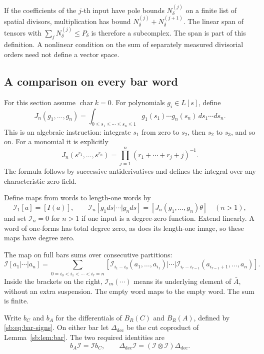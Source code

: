 If the coefficients of the \(j\)-th input have pole bounds
\(N^{(j)}_\delta\) on a finite list of spatial divisors, multiplication
has bound \(N^{(j)}_\delta+N^{(j+1)}_\delta\).
The linear span of tensors with
\(\sum_jN^{(j)}_\delta\le P_\delta\) is therefore a subcomplex.
The span is part of this definition.  A nonlinear condition on the
sum of separately measured divisorial orders need not define a vector space.

\subsection{A comparison on every bar word}

For this section assume \(\operatorname{char}k=0\).
For polynomials \(g_i\in L[s]\), define
\begin{equation}\label{sb:eq:iterated-integral}
 J_n(g_1,\ldots,g_n)=
 \int_{0\le s_1\le\cdots\le s_n\le1}
       g_1(s_1)\cdots g_n(s_n)\,ds_1\cdots ds_n.
\end{equation}
This is an algebraic instruction: integrate \(s_1\) from zero to
\(s_2\), then \(s_2\) to \(s_3\), and so on.
For a monomial it is explicitly
\[
 J_n(s^{r_1},\ldots,s^{r_n})
 =\prod_{j=1}^n(r_1+\cdots+r_j+j)^{-1}.
\]
The formula follows by successive antiderivatives and defines the
integral over any characteristic-zero field.

Define maps from words to length-one words by
\[
 \mathcal I_1[a]=[I(a)],\qquad
 \mathcal I_n[g_1ds|\cdots|g_nds]
       =[J_n(g_1,\ldots,g_n)\theta]\quad(n>1),
\]
and set \(\mathcal I_n=0\) for \(n>1\) if one input is a
degree-zero function.  Extend linearly.  A word of one-forms has total
degree zero, as does its length-one image, so these maps have degree zero.

The map on full bars sums over consecutive partitions:
\begin{equation}\label{sb:eq:bar-map}
 \mathcal I[a_1|\cdots|a_n]
 =\sum_{0=i_0<i_1<\cdots<i_r=n}
   [\mathcal I_{i_1-i_0}(a_1,\ldots,a_{i_1})|\cdots|
    \mathcal I_{i_r-i_{r-1}}(a_{i_{r-1}+1},\ldots,a_n)].
\end{equation}
Inside the brackets on the right, \(\mathcal I_m(\cdots)\)
means its underlying element of \(\bar A\), without an extra suspension.
The empty word maps to the empty word.  The sum is finite.

Write \(b_C\) and \(b_A\) for the differentials of
\(B_R(C)\) and \(B_R(A)\), defined by \eqref{sb:eq:bar-signs}.
On either bar let \(\Delta_{\mathrm{dec}}\) be the cut coproduct
of Lemma~\ref{sb:lem:bar}.  The two required identities are
\begin{equation}\label{sb:eq:spine}
 b_A\mathcal I=\mathcal I b_C,
 \qquad
 \Delta_{\mathrm{dec}}\mathcal I
       =(\mathcal I\otimes\mathcal I)\Delta_{\mathrm{dec}}.
\end{equation}

